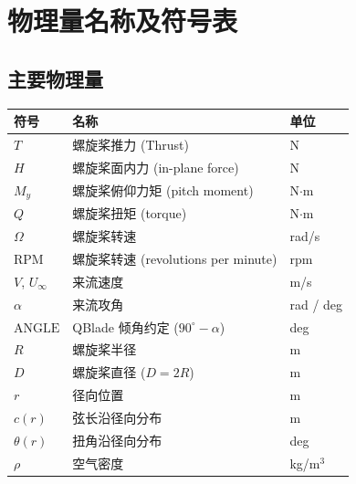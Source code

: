 
\chapter*{物理量名称及符号表}

\section*{主要物理量}

\begin{tabular}{p{2.5cm}p{8cm}p{2.5cm}}
\toprule
\textbf{符号} & \textbf{名称}                       & \textbf{单位}    \\
\midrule
$T$           & 螺旋桨推力 (Thrust)                  & N                \\
$H$           & 螺旋桨面内力 (in-plane force)         & N                \\
$M_y$         & 螺旋桨俯仰力矩 (pitch moment)         & N$\cdot$m        \\
$Q$           & 螺旋桨扭矩 (torque)                  & N$\cdot$m        \\
$\Omega$      & 螺旋桨转速                          & rad/s            \\
$\text{RPM}$  & 螺旋桨转速 (revolutions per minute)  & rpm              \\
$V$, $U_\infty$ & 来流速度                          & m/s              \\
$\alpha$      & 来流攻角                            & rad / deg        \\
$\text{ANGLE}$ & QBlade 倾角约定 ($90^\circ - \alpha$) & deg          \\
$R$           & 螺旋桨半径                          & m                \\
$D$           & 螺旋桨直径 ($D = 2R$)                & m                \\
$r$           & 径向位置                            & m                \\
$c(r)$        & 弦长沿径向分布                      & m                \\
$\theta(r)$   & 扭角沿径向分布                      & deg              \\
$\rho$        & 空气密度                            & kg/m$^3$         \\

\end{tabular}
